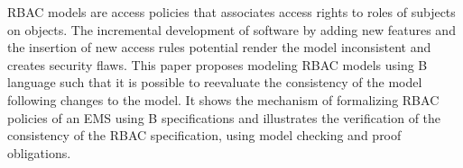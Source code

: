 \ac{RBAC} models are access policies that associates access rights to roles of subjects on objects. The incremental development of software by adding new features and the insertion of new access rules potential render the model inconsistent and creates security flaws. This paper proposes modeling \ac{RBAC} models using B language such that it is possible to reevaluate the consistency of the model following changes to the model. It shows the mechanism of formalizing \ac{RBAC} policies of an \ac{EMS} using B specifications and illustrates the verification of the consistency of the \ac{RBAC} specification, using model checking and proof obligations.